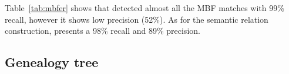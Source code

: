 %
%
%

Table~\ref{tab:mbfer} shows that \framework detected almost all the MBF matches with 99\% recall, 
however it shows low precision (52\%). 
As for the semantic relation construction, \framework presents a 98\% recall and 89\% precision.

\vspace{-1em}
\subsection{Genealogy tree}

